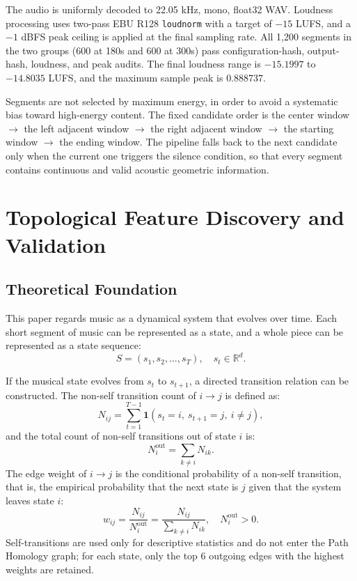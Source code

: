 \documentclass{article}
\begin{document}
The audio is uniformly decoded to 22.05 kHz, mono, float32 WAV. Loudness processing uses two-pass EBU R128 \verb|loudnorm| with a target of $-15$ LUFS, and a $-1$ dBFS peak ceiling is applied at the final sampling rate. All 1,200 segments in the two groups (600 at 180s and 600 at 300s) pass configuration-hash, output-hash, loudness, and peak audits. The final loudness range is $-15.1997$ to $-14.8035$ LUFS, and the maximum sample peak is $0.888737$.

Segments are not selected by maximum energy, in order to avoid a systematic bias toward high-energy content. The fixed candidate order is the center window $\to$ the left adjacent window $\to$ the right adjacent window $\to$ the starting window $\to$ the ending window. The pipeline falls back to the next candidate only when the current one triggers the silence condition, so that every segment contains continuous and valid acoustic geometric information.

\section{Topological Feature Discovery and Validation}

\subsection{Theoretical Foundation}

This paper regards music as a dynamical system that evolves over time. Each short segment of music can be represented as a state, and a whole piece can be represented as a state sequence:
\[S=(s_1,s_2,\ldots,s_T),\quad s_t\in\mathbb R^d.\]

If the musical state evolves from $s_t$ to $s_{t+1}$, a directed transition relation can be constructed. The non-self transition count of $i \to j$ is defined as:
\[N_{ij}=\sum_{t=1}^{T-1} \mathbf 1(s_t=i,\ s_{t+1}=j,\ i\neq j),\]
and the total count of non-self transitions out of state $i$ is:
\[N_i^{\text{out}}=\sum_{k\neq i}N_{ik}.\]
The edge weight of $i \to j$ is the conditional probability of a non-self transition, that is, the empirical probability that the next state is $j$ given that the system leaves state $i$:
\[
w_{ij} = \frac{N_{ij}}{N_i^{\mathrm{out}}} = \frac{N_{ij}}{\sum_{k\neq i}N_{ik}},
\quad N_i^{\mathrm{out}}>0.\]
Self-transitions are used only for descriptive statistics and do not enter the Path Homology graph; for each state, only the top 6 outgoing edges with the highest weights are retained.
\end{document}
